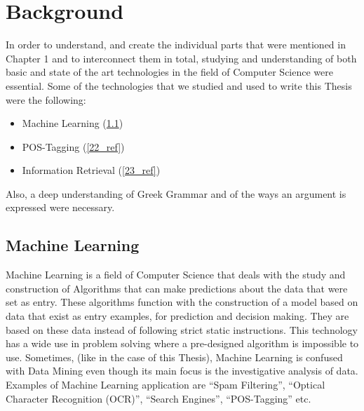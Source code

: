 \chapter{Background}\label{ch_2}
In order to understand, and create the individual parts that were mentioned in Chapter 1 and to interconnect them in total, studying and understanding of both basic and state of the art technologies in the field of Computer Science were essential. Some of the technologies that we studied and used to write this Thesis were the following:\\
\begin{itemize}

	\item Machine Learning (\ref{21_ref})
	\item POS-Tagging (\ref{22_ref})
	\item Information Retrieval (\ref{23_ref})\\

\end{itemize}
Also, a deep understanding of Greek Grammar and of the ways an argument is expressed were necessary.

\section{Machine Learning}\label{21_ref}
Machine Learning is a field of Computer Science that deals with the study and construction of Algorithms that can make predictions about the data that were set as entry. These algorithms function with the construction of a model based on data that exist as entry examples, for prediction and decision making. They are based on these data instead of following strict static instructions. This technology has a wide use in problem solving where a pre-designed algorithm is impossible to use. Sometimes, (like in the case of this Thesis), Machine Learning is confused with Data Mining even though its main focus is the investigative analysis of data. Examples of Machine Learning application are ``Spam Filtering'', ``Optical Character Recognition (OCR)'', ``Search Engines'', ``POS-Tagging'' etc.

